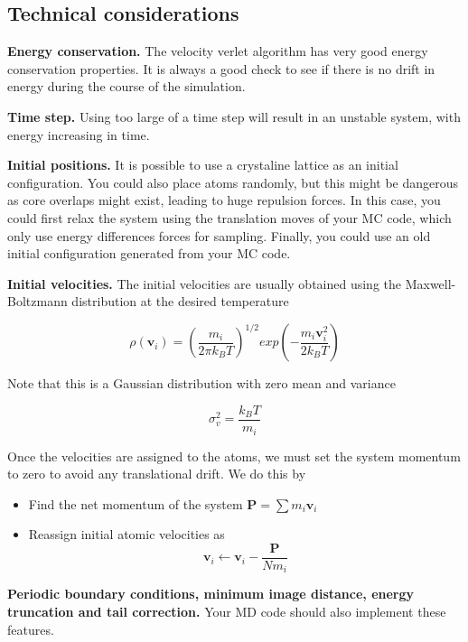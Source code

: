 \documentclass[aip,jcp,preprint,superscriptaddress,floatfix]{revtex4-1}
\begin{document}
\subsection{Technical considerations}

\textbf{Energy conservation. } The velocity verlet algorithm has very good
energy conservation properties. It is always a good check to see if 
there is no drift in energy during the course of the simulation.

\textbf{Time step. } Using too large of a time step will result in an unstable
system, with energy increasing in time. 

\textbf{Initial positions. } It is possible to use a crystaline 
lattice as an initial
configuration. You could also place atoms randomly, but this might be
dangerous as core overlaps might exist, leading to huge repulsion forces. In
this case, you could first relax the system using the translation moves
of your MC code, which only use energy differences forces for sampling. 
Finally, you could use an old initial configuration 
generated from your MC code.

\textbf{Initial velocities. } The initial velocities are usually obtained
using the Maxwell-Boltzmann distribution at the desired temperature

\begin{equation}
	\rho \left(\mathbf{v}_i\right) = \left( \frac{m_i}{2 \pi k_B T} \right) ^ {1/2} exp \left( - \frac{m_i \mathbf{v}_i^2 } {2 k_B T }  \right)
\end{equation}

Note that this is a Gaussian distribution with zero mean and variance

\begin{equation}
	\sigma_v^2 = \frac{k_B T}{m_i}
\end{equation}

Once the velocities are assigned to the atoms, we must set the system momentum
to zero to avoid any translational drift. We do this by 

\begin{itemize}
	\item Find the net momentum of the system $\mathbf{P} = \sum m_i \mathbf{v}_i$
	\item Reassign initial atomic velocities as
		\begin{equation}
			\mathbf{v}_i \leftarrow \mathbf{v}_i - \frac{\mathbf{P}} { N m_i}
		\end{equation}
\end{itemize}

\textbf{Periodic boundary conditions, minimum image distance, 
energy truncation and tail correction. } Your MD code should also implement 
these features.
\end{document}
